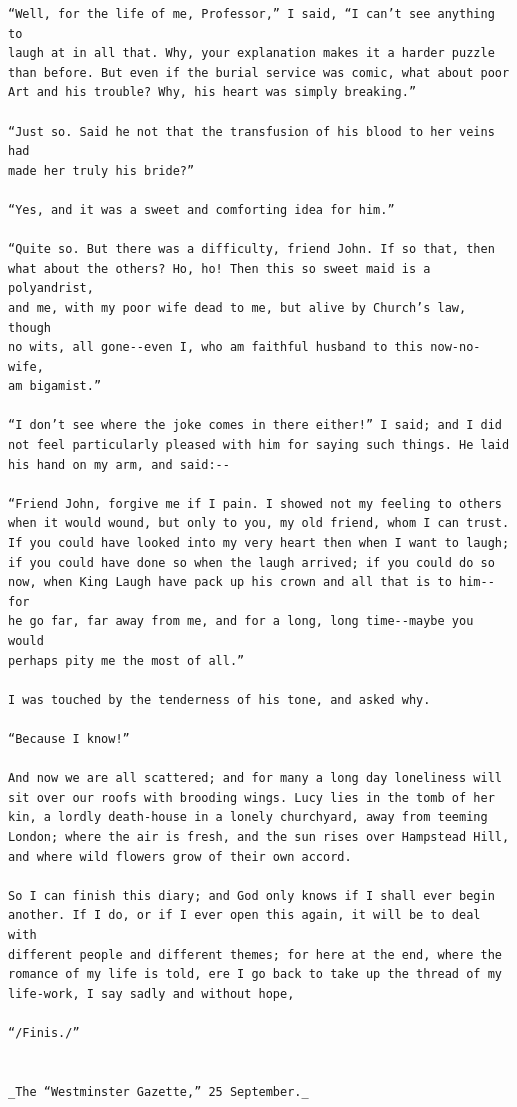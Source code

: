 \documentclass{article}
\begin{document}
\begin{verbatim}
“Well, for the life of me, Professor,” I said, “I can’t see anything to
laugh at in all that. Why, your explanation makes it a harder puzzle
than before. But even if the burial service was comic, what about poor
Art and his trouble? Why, his heart was simply breaking.”

“Just so. Said he not that the transfusion of his blood to her veins had
made her truly his bride?”

“Yes, and it was a sweet and comforting idea for him.”

“Quite so. But there was a difficulty, friend John. If so that, then
what about the others? Ho, ho! Then this so sweet maid is a polyandrist,
and me, with my poor wife dead to me, but alive by Church’s law, though
no wits, all gone--even I, who am faithful husband to this now-no-wife,
am bigamist.”

“I don’t see where the joke comes in there either!” I said; and I did
not feel particularly pleased with him for saying such things. He laid
his hand on my arm, and said:--

“Friend John, forgive me if I pain. I showed not my feeling to others
when it would wound, but only to you, my old friend, whom I can trust.
If you could have looked into my very heart then when I want to laugh;
if you could have done so when the laugh arrived; if you could do so
now, when King Laugh have pack up his crown and all that is to him--for
he go far, far away from me, and for a long, long time--maybe you would
perhaps pity me the most of all.”

I was touched by the tenderness of his tone, and asked why.

“Because I know!”

And now we are all scattered; and for many a long day loneliness will
sit over our roofs with brooding wings. Lucy lies in the tomb of her
kin, a lordly death-house in a lonely churchyard, away from teeming
London; where the air is fresh, and the sun rises over Hampstead Hill,
and where wild flowers grow of their own accord.

So I can finish this diary; and God only knows if I shall ever begin
another. If I do, or if I ever open this again, it will be to deal with
different people and different themes; for here at the end, where the
romance of my life is told, ere I go back to take up the thread of my
life-work, I say sadly and without hope,

“/Finis./”


_The “Westminster Gazette,” 25 September._


\end{verbatim}
\end{document}
